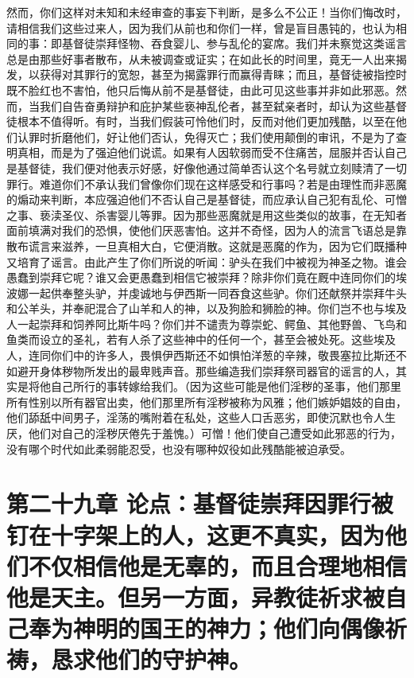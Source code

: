 然而，你们这样对未知和未经审查的事妄下判断，是多么不公正！当你们悔改时，请相信我们这些过来人，因为我们从前也和你们一样，曾是盲目愚钝的，也认为相同的事：即基督徒崇拜怪物、吞食婴儿、参与乱伦的宴席。我们并未察觉这类谣言总是由那些好事者散布，从未被调查或证实；在如此长的时间里，竟无一人出来揭发，以获得对其罪行的宽恕，甚至为揭露罪行而赢得青睐；而且，基督徒被指控时既不脸红也不害怕，他只后悔从前不是基督徒，由此可见这些事并非如此邪恶。然而，当我们自告奋勇辩护和庇护某些亵神乱伦者，甚至弑亲者时，却认为这些基督徒根本不值得听。有时，当我们假装可怜他们时，反而对他们更加残酷，以至在他们认罪时折磨他们，好让他们否认，免得灭亡；我们使用颠倒的审讯，不是为了查明真相，而是为了强迫他们说谎。如果有人因软弱而受不住痛苦，屈服并否认自己是基督徒，我们便对他表示好感，好像他通过简单否认这个名号就立刻赎清了一切罪行。难道你们不承认我们曾像你们现在这样感受和行事吗？若是由理性而非恶魔的煽动来判断，本应强迫他们不否认自己是基督徒，而应承认自己犯有乱伦、可憎之事、亵渎圣仪、杀害婴儿等罪。因为那些恶魔就是用这些类似的故事，在无知者面前填满对我们的恐惧，使他们厌恶害怕。这并不奇怪，因为人的流言飞语总是靠散布谎言来滋养，一旦真相大白，它便消散。这就是恶魔的作为，因为它们既播种又培育了谣言。由此产生了你们所说的听闻：驴头在我们中被视为神圣之物。谁会愚蠢到崇拜它呢？谁又会更愚蠢到相信它被崇拜？除非你们竟在厩中连同你们的埃波娜一起供奉整头驴，并虔诚地与伊西斯一同吞食这些驴。你们还献祭并崇拜牛头和公羊头，并奉祀混合了山羊和人的神，以及狗脸和狮脸的神。你们岂不也与埃及人一起崇拜和饲养阿比斯牛吗？你们并不谴责为尊崇蛇、鳄鱼、其他野兽、飞鸟和鱼类而设立的圣礼，若有人杀了这些神中的任何一个，甚至会被处死。这些埃及人，连同你们中的许多人，畏惧伊西斯还不如惧怕洋葱的辛辣，敬畏塞拉比斯还不如避开身体秽物所发出的最卑贱声音。那些编造我们崇拜祭司器官的谣言的人，其实是将他自己所行的事转嫁给我们。（因为这些可能是他们淫秽的圣事，他们那里所有性别以所有器官出卖，他们那里所有淫秽被称为风雅；他们嫉妒娼妓的自由，他们舔舐中间男子，淫荡的嘴附着在私处，这些人口舌恶劣，即使沉默也令人生厌，他们对自己的淫秽厌倦先于羞愧。）可憎！他们使自己遭受如此邪恶的行为，没有哪个时代如此柔弱能忍受，也没有哪种奴役如此残酷能被迫承受。\par


\section{第二十九章 论点：基督徒崇拜因罪行被钉在十字架上的人，这更不真实，因为他们不仅相信他是无辜的，而且合理地相信他是天主。但另一方面，异教徒祈求被自己奉为神明的国王的神力；他们向偶像祈祷，恳求他们的守护神。}

